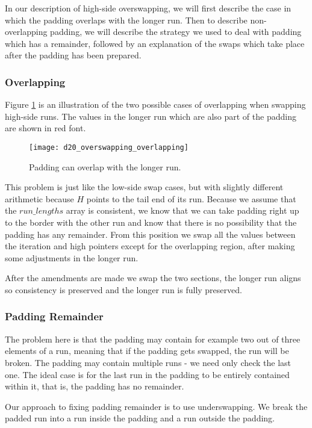 In our description of high-side overswapping, we will first describe the case in which the padding overlaps with the longer run. Then to describe non-overlapping padding, we will describe the strategy we used to deal with padding which has a remainder, followed by an explanation of the swaps which take place after the padding has been prepared.

\subsubsection{Overlapping}

Figure \ref{fig:overswapping_overlapping} is an illustration of the two possible cases of overlapping when swapping high-side runs. The values in the longer run which are also part of the padding are shown in red font.

\begin{figure}[H]
  \centering
  \texttt{[image: d20\_overswapping\_overlapping]}
  \caption{Padding can overlap with the longer run.}
  \label{fig:overswapping_overlapping}
\end{figure}

This problem is just like the low-side swap cases, but with slightly different arithmetic because $H$ points to the tail end of its run. Because we assume that the $run\_lengths$ array is consistent, we know that we can take padding right up to the border with the other run and know that there is no possibility that the padding has any remainder. From this position we swap all the values between the iteration and high pointers except for the overlapping region, after making some adjustments in the longer run.

After the amendments are made we swap the two sections, the longer run aligns so consistency is preserved and the longer run is fully preserved.

\subsubsection{Padding Remainder}

The problem here is that the padding may contain for example two out of three elements of a run, meaning that if the padding gets swapped, the run will be broken. The padding may contain multiple runs - we need only check the last one. The ideal case is for the last run in the padding to be entirely contained within it, that is, the padding has no remainder.

Our approach to fixing padding remainder is to use underswapping. We break the padded run into a run inside the padding and a run outside the padding.

